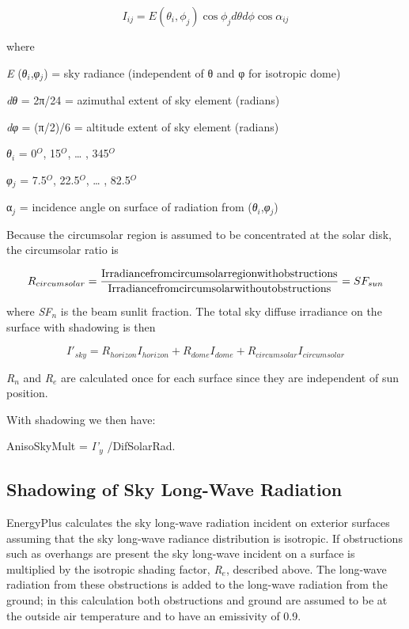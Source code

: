 \begin{equation}
{I_{ij}} = E({\theta_i},{\phi_j})\cos {\phi_j}d\theta d\phi \cos {\alpha_{ij}}
\end{equation}

where

\emph{E} (\emph{θ\(_{i}\)},\emph{φ\(_{j}\)}) = sky radiance (independent of θ and φ for isotropic dome)

\emph{dθ} = 2π/24 = azimuthal extent of sky element (radians)

\emph{dφ} = (π/2)/6 = altitude extent of sky element (radians)

\emph{θ\(_{i}\)} = 0\(^{O}\), 15\(^{O}\), \ldots{} , 345\(^{O}\)

\emph{φ\(_{j}\)} = 7.5\(^{O}\), 22.5\(^{O}\), \ldots{} , 82.5\(^{O}\)

α\(_{j}\) = incidence angle on surface of radiation from (\emph{θ\(_{i}\)},\emph{φ\(_{j}\)})

Because the circumsolar region is assumed to be concentrated at the solar disk, the circumsolar ratio is

\begin{equation}
{R_{circumsolar}} = \frac{{{\rm{Irradiance from circumsolar region with obstructions}}}}{{{\rm{Irradiance from circumsolar without obstructions}}}} = S{F_{sun}}
\end{equation}

where \emph{SF\(_{n}\)} is the beam sunlit fraction. The total sky diffuse irradiance on the surface with shadowing is then

\begin{equation}
{I'_{sky}} = {R_{horizon}}{I_{horizon}} + {R_{dome}}{I_{dome}} + {R_{circumsolar}}{I_{circumsolar}}
\end{equation}

\emph{R\(_{n}\)} and \emph{R\(_{e}\)} are calculated once for each surface since they are independent of sun position.

With shadowing we then have:

AnisoSkyMult = \emph{I'\(_{y}\)} /DifSolarRad.

\subsection{Shadowing of Sky Long-Wave Radiation}\label{shadowing-of-sky-long-wave-radiation}

EnergyPlus calculates the sky long-wave radiation incident on exterior surfaces assuming that the sky long-wave radiance distribution is isotropic. If obstructions such as overhangs are present the sky long-wave incident on a surface is multiplied by the isotropic shading factor, \emph{R\(_{e}\)}, described above. The long-wave radiation from these obstructions is added to the long-wave radiation from the ground; in this calculation both obstructions and ground are assumed to be at the outside air temperature and to have an emissivity of 0.9.

